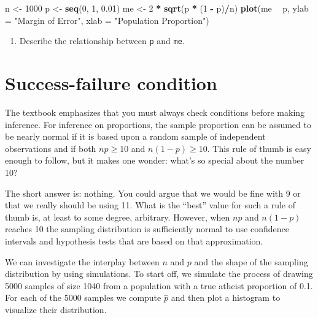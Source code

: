 \documentclass[]{book}
\newenvironment{Shaded}{\begin{snugshade}}{\end{snugshade}}
\newcommand{\DataTypeTok}[1]{\textcolor[rgb]{0.13,0.29,0.53}{#1}}
\newcommand{\DecValTok}[1]{\textcolor[rgb]{0.00,0.00,0.81}{#1}}
\newcommand{\FloatTok}[1]{\textcolor[rgb]{0.00,0.00,0.81}{#1}}
\newcommand{\KeywordTok}[1]{\textcolor[rgb]{0.13,0.29,0.53}{\textbf{#1}}}
\newcommand{\NormalTok}[1]{#1}
\newcommand{\OperatorTok}[1]{\textcolor[rgb]{0.81,0.36,0.00}{\textbf{#1}}}
\newcommand{\StringTok}[1]{\textcolor[rgb]{0.31,0.60,0.02}{#1}}
\providecommand{\tightlist}{%
  \setlength{\itemsep}{0pt}\setlength{\parskip}{0pt}}
\theoremstyle{definition}
\theoremstyle{definition}
\theoremstyle{definition}
\theoremstyle{remark}
\begin{document}
\begin{Shaded}
\begin{Highlighting}[]
\NormalTok{n <-}\StringTok{ }\DecValTok{1000}
\NormalTok{p <-}\StringTok{ }\KeywordTok{seq}\NormalTok{(}\DecValTok{0}\NormalTok{, }\DecValTok{1}\NormalTok{, }\FloatTok{0.01}\NormalTok{)}
\NormalTok{me <-}\StringTok{ }\DecValTok{2} \OperatorTok{*}\StringTok{ }\KeywordTok{sqrt}\NormalTok{(p }\OperatorTok{*}\StringTok{ }\NormalTok{(}\DecValTok{1} \OperatorTok{-}\StringTok{ }\NormalTok{p)}\OperatorTok{/}\NormalTok{n)}
\KeywordTok{plot}\NormalTok{(me }\OperatorTok{~}\StringTok{ }\NormalTok{p, }\DataTypeTok{ylab =} \StringTok{"Margin of Error"}\NormalTok{, }\DataTypeTok{xlab =} \StringTok{"Population Proportion"}\NormalTok{)}
\end{Highlighting}
\end{Shaded}

\begin{enumerate}
\def\labelenumi{\arabic{enumi}.}
\setcounter{enumi}{7}
\tightlist
\item
  Describe the relationship between \texttt{p} and \texttt{me}.
\end{enumerate}

\hypertarget{success-failure-condition}{%
\section{Success-failure condition}\label{success-failure-condition}}

The textbook emphasizes that you must always check conditions before
making inference. For inference on proportions, the sample proportion
can be assumed to be nearly normal if it is based upon a random sample
of independent observations and if both \(np \geq 10\) and
\(n(1 - p) \geq 10\). This rule of thumb is easy enough to follow, but
it makes one wonder: what's so special about the number 10?

The short answer is: nothing. You could argue that we would be fine with
9 or that we really should be using 11. What is the ``best'' value for
such a rule of thumb is, at least to some degree, arbitrary. However,
when \(np\) and \(n(1-p)\) reaches 10 the sampling distribution is
sufficiently normal to use confidence intervals and hypothesis tests
that are based on that approximation.

We can investigate the interplay between \(n\) and \(p\) and the shape
of the sampling distribution by using simulations. To start off, we
simulate the process of drawing 5000 samples of size 1040 from a
population with a true atheist proportion of 0.1. For each of the 5000
samples we compute \(\hat{p}\) and then plot a histogram to visualize
their distribution.
\end{document}
